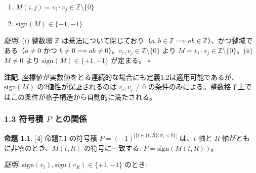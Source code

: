 \documentclass[
  a4paper,11pt]{ltjsarticle}
\begin{document}
\begin{enumerate}
\def\labelenumi{(\roman{enumi})}
\item
  \(M(i,j) = v_i \cdot v_j \in \mathbb{Z} \setminus \{0\}\)
\item
  \(\text{sign}(M) \in \{+1, -1\}\)
\end{enumerate}

\emph{証明}. (i) 整数環 \(\mathbb{Z}\)
は乗法について閉じており（\(a, b \in \mathbb{Z} \implies ab \in \mathbb{Z}\)）、かつ整域である（\(a \neq 0\)
かつ
\(b \neq 0 \implies ab \neq 0\)）。\(v_i, v_j \in \mathbb{Z} \setminus \{0\}\)
より \(M = v_i \cdot v_j \in \mathbb{Z} \setminus \{0\}\)。(ii)
\(M \neq 0\) より \(\text{sign}(M) \in \{+1, -1\}\) が定まる。
\(\square\)

\textbf{注記}.
座標値が実数値をとる連続的な場合にも定義1.2は適用可能であるが、\(\text{sign}(M)\)
の2値性が保証されるのは \(v_i, v_j \neq 0\)
の条件のみによる。整数格子上ではこの条件が格子構造から自動的に満たされる。

\subsubsection{\texorpdfstring{1.3 符号積 \(P\)
との関係}{1.3 符号積 P との関係}}\label{ux7b26ux53f7ux7a4d-p-ux3068ux306eux95a2ux4fc2}

\textbf{命題 1.1}. {[}4{]} 命題7.1 の符号積
\(P = (-1)^{|\{i \in \{t, R\} : \sigma_i < 0\}|}\) は、\(t\) 軸と \(R\)
軸がともに非零のとき、\(M(t, R)\) の符号に一致する:
\(P = \text{sign}(M(t, R))\)。

\emph{証明}. \(\text{sign}(v_t), \text{sign}(v_R) \in \{+1, -1\}\)
のとき:
\end{document}
